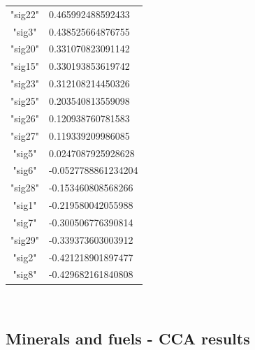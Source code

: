 \documentclass[11pt,a4paper,oneside]{report}
\begin{document}
\begin{tabular}{ c | l }
"sig22" & 0.465992488592433\\
"sig3" & 0.438525664876755\\
"sig20" & 0.331070823091142\\
"sig15" & 0.330193853619742\\
"sig23" & 0.312108214450326\\
"sig25" & 0.203540813559098\\
"sig26" & 0.120938760781583\\
"sig27" & 0.119339209986085\\
"sig5" & 0.0247087925928628\\
"sig6" & -0.0527788861234204\\
"sig28" & -0.153460808568266\\
"sig1" & -0.219580042055988\\
"sig7" & -0.300506776390814\\
"sig29" & -0.339373603003912\\
"sig2" & -0.421218901897477\\
"sig8" & -0.429682161840808\\
\end{tabular}\\


\subsection*{Minerals and fuels - CCA results}
\end{document}
